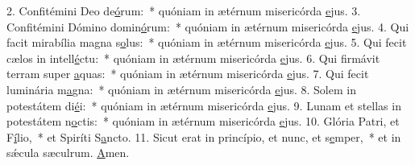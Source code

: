 2. Confitémini Deo de\uline{ó}rum:~* quóniam in ætérnum misericórda \uline{e}jus.
3. Confitémini Dómino domin\uline{ó}rum:~* quóniam in ætérnum misericórda \uline{e}jus.
4. Qui facit mirabília magna s\uline{o}lus:~* quóniam in ætérnum misericórda \uline{e}jus.
5. Qui fecit cælos in intell\uline{é}ctu:~* quóniam in ætérnum misericórda \uline{e}jus.
6. Qui firmávit terram super \uline{a}quas:~* quóniam in ætérnum misericórda \uline{e}jus.
7. Qui fecit luminária m\uline{a}gna:~* quóniam in ætérnum misericórda \uline{e}jus.
8. Solem in potestátem di\uline{é}i:~* quóniam in ætérnum misericórda \uline{e}jus.
9. Lunam et stellas in potestátem n\uline{o}ctis:~* quóniam in ætérnum misericórda \uline{e}jus.
10. Glória Patri, et F\uline{í}lio,~* et Spiríti S\uline{a}ncto.
11. Sicut erat in princípio, et nunc, et s\uline{e}mper,~* et in sǽcula sæculrum. \uline{A}men.
